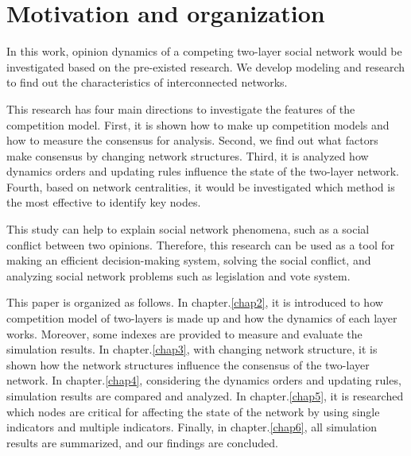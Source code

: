 \section{Motivation and organization}

In this work, opinion dynamics of a competing two-layer social network would be investigated based on the pre-existed research\parencite{alvarez2016, gomez2015, diep2017, rocca2014}. We develop modeling and research to find out the characteristics of interconnected networks. 

This research has four main directions to investigate the features of the competition model. First, it is shown how to make up competition models and how to measure the consensus for analysis. Second, we find out what factors make consensus by changing network structures. Third, it is analyzed how dynamics orders and updating rules influence the state of the two-layer network. Fourth, based on network centralities, it would be investigated which method is the most effective to identify key nodes.

This study can help to explain social network phenomena, such as a social conflict between two opinions. Therefore, this research can be used as a tool for making an efficient decision-making system, solving the social conflict, and analyzing social network problems such as legislation and vote system.

This paper is organized as follows. In chapter.\ref{chap2}, it is introduced to how competition model of two-layers is made up and how the dynamics of each layer works. Moreover, some indexes are provided to measure and evaluate the simulation results. In chapter.\ref{chap3}, with changing network structure, it is shown how the network structures influence the consensus of the two-layer network. In chapter.\ref{chap4}, considering the dynamics orders and updating rules, simulation results are compared and analyzed. In chapter.\ref{chap5}, it is researched which nodes are critical for affecting the state of the network by using single indicators and multiple indicators. Finally, in chapter.\ref{chap6}, all simulation results are summarized, and our findings are concluded. \\


